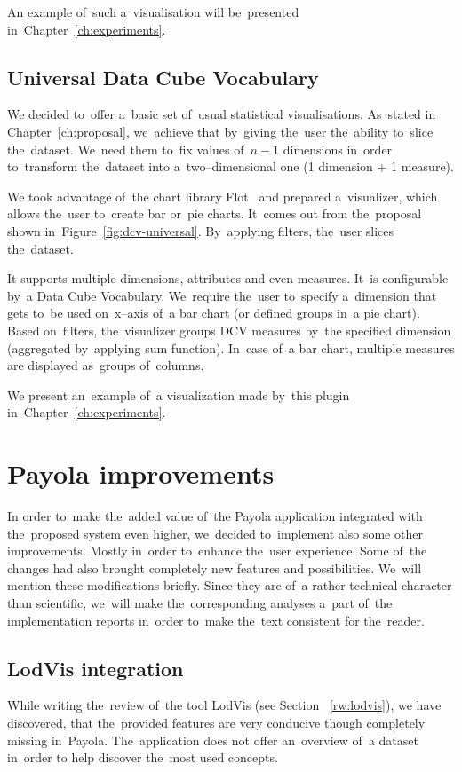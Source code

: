 An example of~such a~visualisation will be~presented in~Chapter~\ref{ch:experiments}.

\subsection{Universal Data Cube Vocabulary}
We decided to~offer a~basic set of~usual statistical visualisations. As~stated 
in Chapter~\ref{ch:proposal}, we~achieve that by~giving the~user the~ability to~slice the~dataset. We~need them to~fix values of~$n-1$ dimensions in~order to~transform the~dataset into a~two--dimensional one (1 dimension + 1 measure).

We took advantage of~the chart library Flot~\cite{flot} and prepared a~visualizer, which allows the~user to~create bar or~pie charts. It~comes out from the~proposal shown in~Figure~\ref{fig:dcv-universal}. By~applying filters, the~user slices the~dataset.

It supports multiple dimensions, attributes and even measures. It~is 
configurable by~a Data Cube Vocabulary. We~require the~user to~specify a~dimension that gets to~be used on~x--axis of~a bar chart (or defined groups in~a 
pie chart). Based on~filters, the~visualizer groups DCV measures by~the specified 
dimension (aggregated by~applying sum function). In~case of~a bar chart, multiple measures are 
displayed as~groups of~columns.

We present an~example of~a visualization made by~this plugin in~Chapter~\ref{ch:experiments}.

\section{Payola improvements}
In order to~make the~added value of~the Payola application integrated with the~proposed system even higher, we~decided to~implement also some other
improvements. Mostly in~order to~enhance the~user experience. Some of~the changes
had also brought completely new features and possibilities. We~will mention 
these modifications briefly. Since they are of~a rather technical character 
than scientific, we~will make the~corresponding analyses a~part of~the 
implementation reports in~order to~make the~text consistent for the~reader.

\subsection{LodVis integration}
While writing the~review of~the tool LodVis (see Section ~\ref{rw:lodvis}), 
we have discovered, that the~provided features are very conducive though completely 
missing in~Payola. The~application does not offer an~overview of~a dataset in~order 
to help discover the~most used concepts.

